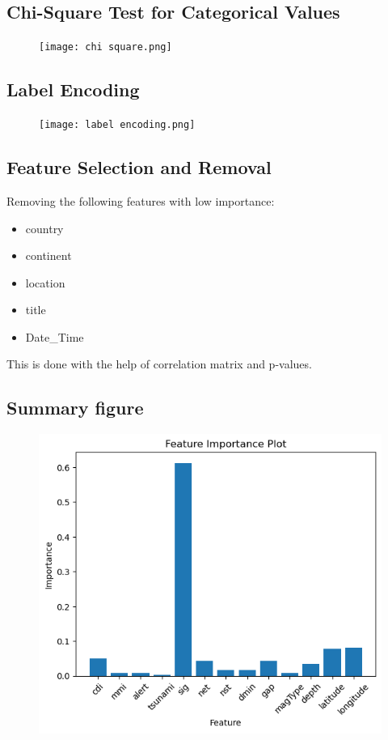 \documentclass{article}
\begin{document}
\subsection{Chi-Square Test for Categorical Values}
\begin{figure}[H]
    \centering
    \texttt{[image: chi square.png]} 
    \vspace*{-0.5cm}
    \label{fig:eda}
\end{figure}

\subsection{Label Encoding}
\begin{figure}[H]
    \centering
    \texttt{[image: label encoding.png]} 
    \vspace*{-0.5cm}
    \label{fig:eda}
\end{figure}

\subsection{Feature Selection and Removal}
Removing the following features with low importance:
\begin{itemize}
    \item country
    \item continent
    \item location
    \item title
    \item Date\_Time
\end{itemize}
This is done with the help of correlation matrix and p-values.

\subsection{Summary figure}
\begin{figure}[H]
    \centering
    \includegraphics[width=0.8\linewidth]{feature Importance Plot.png} 
    \vspace*{-0.5cm}
    \label{fig:eda}
\end{figure}
\end{document}
